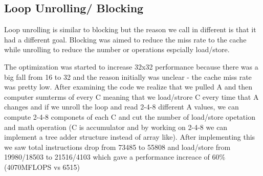\documentclass{article}
\begin{document}
\subsection{Loop Unrolling/ Blocking}
Loop unrolling is similar to blocking but the reason we call in different is that it had a different goal. Blocking was aimed to reduce the miss rate to the cache while unrolling to reduce the number or operations espcially load/store.

The optimization was started to increase 32x32 performance because there was a big fall from 16 to 32 and the reason initially was unclear - the cache miss rate was pretty low. After examining the code we realize that we pulled A and then computer sumterms of every C meaning that we load/strore C every time that A changes and if we unroll the loop and read 2-4-8 different A values, we can compute 2-4-8 componets of each C and cut the number of load/store opetation and math operation (C is accumulator and by working on 2-4-8 we can implement a tree adder structure instead of array like). After implementing this we saw total instructions drop from 73485 to 55808 and load/store from 19980/18503 to 21516/4103 which gave a performance increace of 60\% (4070MFLOPS vs 6515)
\end{document}
